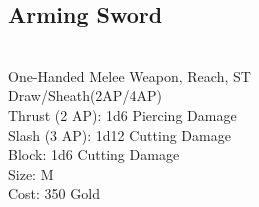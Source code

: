 \subsection{Arming Sword}\label{weapon:armingSword}\\
One-Handed Melee Weapon,  Reach, ST\\
Draw/Sheath(2AP/4AP)\\
Thrust (2 AP): 1d6 Piercing Damage\\
Slash (3 AP): 1d12 Cutting Damage\\
Block: 1d6 Cutting Damage\\
Size: M\\
Cost: 350 Gold\\